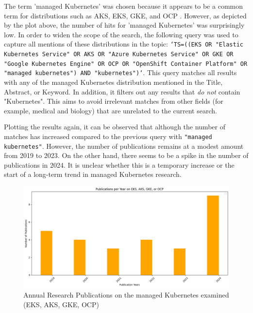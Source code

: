 The term 'managed Kubernetes' was chosen because it appears to be a common term for distributions such as AKS, EKS, GKE, and OCP \cite{AmazonEKSCustomers,ManagedKubernetesService,pereiraferreiraPerformanceEvaluationContainers2019}. However, as depicted by the plot above, the number of hits for 'managed Kubernetes' was surprisingly low. In order to widen the scope of the search, the following query was used to capture all mentions of these distributions in the topic: \texttt{`TS=((EKS OR "Elastic Kubernetes Service" OR AKS OR "Azure Kubernetes Service" OR GKE OR "Google Kubernetes Engine" OR OCP OR "OpenShift Container Platform" OR "managed kubernetes") AND "kubernetes")`}. This query matches all results with any of the managed Kubernetes distribution mentioned in the Title, Abstract, or Keyword. In addition, it filters out any results that \textit{do not} contain "Kubernetes". This aims to avoid irrelevant matches from other fields (for example, medical and biology) that are unrelated to the current search.

Plotting the results again, it can be observed that although the number of matches has increased compared to the previous query with \texttt{"managed kubernetes"}. However, the number of publications remains at a modest amount from 2019 to 2023. On the other hand, there seems to be a spike in the number of publications in 2024. It is unclear whether this is a temporary increase or the start of a long-term trend in managed Kubernetes research.

\FloatBarrier


\begin{figure}
    \centering
    \includegraphics[width=1\linewidth]{resources/managed-k8s-broaden-scope.png}
    \caption{Annual Research Publications on the managed Kubernetes examined (EKS, AKS, GKE, OCP)}
    \label{fig:managed-k8s-broaden-scope}
\end{figure}


